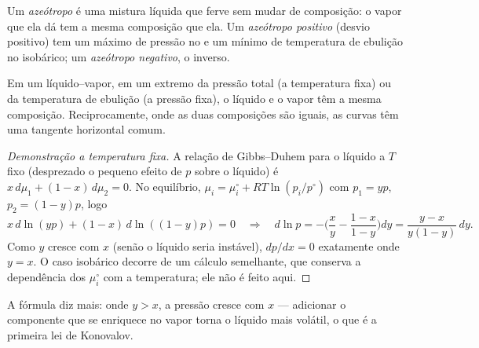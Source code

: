 \begin{definition}[Azeótropo]\label{def:b2:liquid-vapour-diagrams:azeotrope}
Um \emph{azeótropo} é uma mistura líquida que ferve sem
mudar de composição: o vapor que ela dá tem a mesma composição que ela. Um
\emph{azeótropo positivo} (desvio positivo) tem
um máximo de pressão no  e um mínimo de temperatura de
ebulição no isobárico; um \emph{azeótropo negativo},
o inverso.
\end{definition}

\begin{theorem}\label{thm:b2:liquid-vapour-diagrams:konovalov}
Em um  líquido--vapor, em um extremo da pressão total (a
temperatura fixa) ou da temperatura de ebulição (a pressão fixa), o líquido
e o vapor têm a mesma composição. Reciprocamente, onde as duas composições
são iguais, as curvas têm uma tangente horizontal comum.
\end{theorem}

\begin{proof}[Demonstração a temperatura fixa]
A relação de Gibbs--Duhem para o líquido a $T$ fixo (desprezado o pequeno
efeito de $p$ sobre o líquido) é $x\,d\mu_1 + (1 - x)\,d\mu_2 = 0$. No equilíbrio,
$\mu_i = \mu_i^\circ + RT\ln(p_i/p^\circ)$ com $p_1 = yp$, $p_2 = (1 - y)p$, logo
\[
  x\,d\ln(yp) + (1 - x)\,d\ln((1 - y)p) = 0
  \quad\Longrightarrow\quad
  d\ln p = -\Big(\frac{x}{y} - \frac{1 - x}{1 - y}\Big)dy
  = \frac{y - x}{y(1 - y)}\,dy .
\]
Como $y$ cresce com $x$ (senão o líquido seria instável),
$dp/dx = 0$ exatamente onde $y = x$. O caso isobárico decorre de um cálculo
semelhante, que conserva a dependência dos $\mu_i^\circ$ com a temperatura;
ele não é feito aqui.
\end{proof}

A fórmula diz mais: onde $y > x$, a pressão cresce com $x$ ---
adicionar o componente que se enriquece no vapor torna o líquido mais
volátil, o que é a primeira lei de Konovalov.

